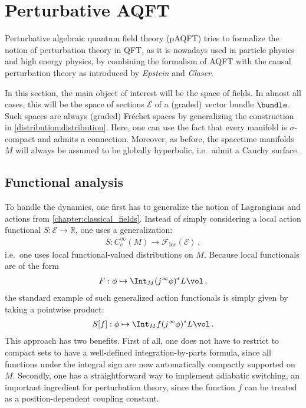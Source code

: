 \section{Perturbative AQFT}

    Perturbative algebraic quantum field theory (pAQFT) tries to formalize the notion of perturbation theory in QFT, as it is nowadays used in particle physics and high energy physics, by combining the formalism of AQFT with the causal perturbation theory as introduced by \textit{Epstein} and \textit{Glaser}.

    In this section, the main object of interest will be the space of fields. In almost all cases, this will be the space of sections $\mathcal{E}$ of a (graded) vector bundle $\bundle$. Such spaces are always (graded) Fr\'echet spaces by generalizing the construction in \cref{distribution:distribution}. Here, one can use the fact that every manifold is $\sigma$-compact and admits a connection. Moreover, as before, the spacetime manifolds $M$ will always be assumed to be globally hyperbolic, i.e.~admit a Cauchy surface.

\subsection{Functional analysis}

    To handle the dynamics, one first has to generalize the notion of Lagrangians and actions from \cref{chapter:classical_fields}. Instead of simply considering a local action functional $S:\mathcal{E}\rightarrow\mathbb{R}$, one uses a generalization:
    \begin{gather}
        S:C^\infty_c(M)\rightarrow\mathcal{F}_{\text{loc}}(\mathcal{E})\,,
    \end{gather}
    i.e.~one uses local functional-valued distributions on $M$. Because local functionals are of the form
    \begin{gather}
        F:\phi\mapsto\Int_M (j^\infty\phi)^*L\vol\,,
    \end{gather}
    the standard example of such generalized action functionals is simply given by taking a pointwise product:
    \begin{gather}
        S[f]:\phi\mapsto\Int_Mf(j^\infty\phi)^*L\vol\,.
    \end{gather}
    This approach has two benefits. First of all, one does not have to restrict to compact sets to have a well-defined integration-by-parts formula, since all functions under the integral sign are now automatically compactly supported on $M$. Secondly, one has a straightforward way to implement adiabatic switching, an important ingredient for perturbation theory, since the function $f$ can be treated as a position-dependent coupling constant.

